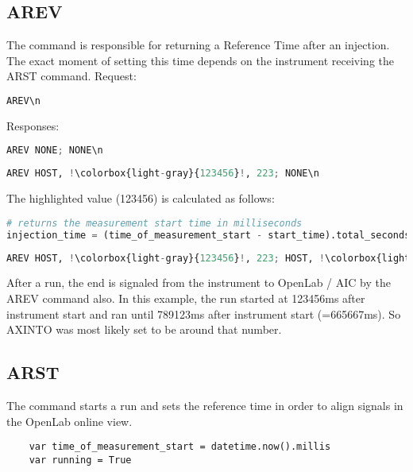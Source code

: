 \documentclass[]{scrartcl}
\begin{document}
	\subsection{AREV}
	The  command is responsible for returning a Reference Time after an injection. The exact moment of setting this time depends on the instrument receiving the ARST command.
Request:
\begin{lstlisting}[language=Python,escapechar=!,caption=Request (AIC$\rightarrow{}$Instrument),showspaces=true]
AREV\n
\end{lstlisting}
Responses:
\begin{lstlisting}[language=Python,escapechar=!,caption=Response (Instrument$\rightarrow{}$AIC) - No injection yet,showspaces=true]
AREV NONE; NONE\n
\end{lstlisting}
\begin{lstlisting}[language=Python,escapechar=!,caption=Response (Instrument$\rightarrow{}$AIC) - Injection happend and run ongoing,showspaces=true]
AREV HOST, !\colorbox{light-gray}{123456}!, 223; NONE\n
\end{lstlisting}
The highlighted value (123456) is calculated as follows: 
\begin{lstlisting}[language=Python,escapechar=!,caption=calculation of injection time,breaklines=true]
# returns the measurement start time in milliseconds
injection_time = (time_of_measurement_start - start_time).total_seconds()*1000 
\end{lstlisting}
\begin{lstlisting}[language=Python,escapechar=!,caption=Response (Instrument$\rightarrow{}$AIC) - Run finished,showspaces=true]
AREV HOST, !\colorbox{light-gray}{123456}!, 223; HOST, !\colorbox{light-gray}{789123}!, 255\n
\end{lstlisting}
After a run, the end is signaled from the instrument to OpenLab / AIC by the AREV command also. In this example, the run started at 123456ms after instrument start and ran until 789123ms after instrument start (=665667ms).
So AXINTO was most likely set to be around that number.

	\subsection{ARST}
	The  command starts a run and sets the reference time in order to align signals in the OpenLab online view.
	\begin{verbatim}
	var time_of_measurement_start = datetime.now().millis
	var running = True
	\end{verbatim}
\end{document}
